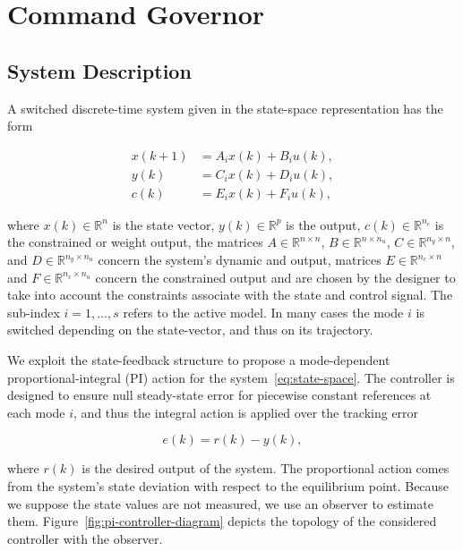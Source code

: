 \section{Command Governor}%
\label{sec:command-governor}

\subsection{System Description}%
\label{subsec:system-description}

A switched discrete-time system given in the state-space representation has the
form

\begin{equation}
	\label{eq:state-space}
	\begin{aligned}
		x(k+1) & = A_{i}x(k)+B_{i}u(k), \\
		y(k)   & = C_{i}x(k)+D_{i}u(k), \\
		c(k)   & = E_{i}x(k)+F_{i}u(k),
	\end{aligned}
\end{equation}

where \(x(k)\in\mathbb{R}^n\) is the state vector, \(y(k)\in\mathbb{R}^p\) is the
output, \(c(k)\in\mathbb{R}^{n_c}\) is the constrained or weight output, the
matrices \(A\in\mathbb{R}^{n\times{}n}\), \(B\in\mathbb{R}^{n\times{}n_u}\),
\(C\in\mathbb{R}^{n_y\times{}n}\), and \(D\in\mathbb{R}^{n_y\times{}n_u}\) concern the
system's dynamic and output, matrices \(E\in\mathbb{R}^{n_c\times{}n}\) and
\(F\in\mathbb{R}^{n_c\times{}n_u}\) concern the constrained output and are chosen by
the designer to take into account the constraints associate with the state and
control signal. The sub-index \(i = 1,\ldots, s\) refers to the active model. In many
cases the mode \(i\) is switched depending on the state-vector, and thus on its
trajectory.

We exploit the state-feedback structure to propose a mode-dependent
proportional-integral (PI) action for the system~\eqref{eq:state-space}. The
controller is designed to ensure null steady-state error for piecewise constant
references at each mode \(i\), and thus the integral action is applied over the
tracking error \citep{Lopes2020}

\begin{equation}
	\label{eq:r-y-error}
	e(k) = r(k)-y(k),
\end{equation}

where \(r(k)\) is the desired output of the system. The proportional action
comes from the system's state deviation with respect to the equilibrium point.
Because we suppose the state values are not measured, we use an observer to
estimate them. Figure~\ref{fig:pi-controller-diagram} depicts the topology of
the considered controller with the observer.

